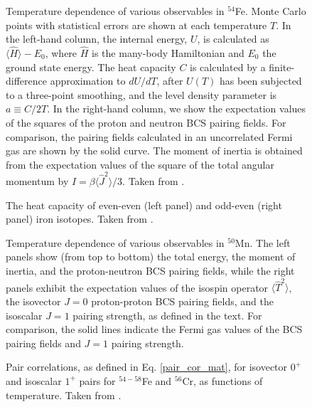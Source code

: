 \documentclass[preprint,rmp,aps,floatfix]{revtex4}
\begin{document}
\begin{figure}
\caption{
Temperature dependence of various observables in ${}^{54}$Fe. Monte
Carlo points with statistical errors are shown at each temperature $T$. In
the left-hand column, the internal energy, $U$,
is calculated as $\langle {\hat H}
\rangle -E_0$, where ${\hat H}$ is the many-body Hamiltonian and $E_0$ the
ground
state energy. The heat capacity $C$ is calculated by a finite-difference
approximation to $dU/dT$, after $U(T)$ has been subjected to a three-point
smoothing, and the level density parameter is $a\equiv C/2T$.
In the right-hand column, we show the expectation values of the
squares of the proton and neutron BCS pairing fields.
For comparison, the pairing fields
calculated in an uncorrelated Fermi gas are shown by the solid curve. The
moment of inertia is obtained from the expectation values of the square of
the total angular momentum by $I=\beta \langle {\hat J}^2 \rangle/3$.
Taken from  \protect\cite{Dean95}.}
\label{fig_810}
\end{figure}

\begin{figure}
\caption{
The heat capacity of even-even (left panel) and
odd-even (right panel) iron isotopes. Taken from  \protect\cite{liu01}.
\label{fig:figyoram}}
\end{figure}


\begin{figure}
\caption{
Temperature dependence of various observables in $^{50}$Mn.
The left panels show (from top to bottom) the total energy,
the moment of inertia, and the proton-neutron BCS pairing fields,
while the right panels exhibit
the expectation values of the isospin operator
$\langle \hat T^2 \rangle$, the isovector $J=0$ proton-proton 
BCS pairing fields, and the isoscalar $J=1$ pairing
strength, as defined in the text. For comparison,
the solid lines indicate the
Fermi gas values of the BCS pairing fields and $J=1$ pairing strength.
}
\label{fig_812}
\end{figure}


\begin{figure}
\caption{
Pair correlations, as defined in Eq. \ref{pair_cor_mat},
for isovector $0^+$ and isoscalar $1^+$ pairs for $^{54-58}$Fe
and $^{56}$Cr, as functions of temperature. Taken from  \protect\cite{Langanke95b}.
}
\label{fig_813}
\end{figure}
\end{document}
